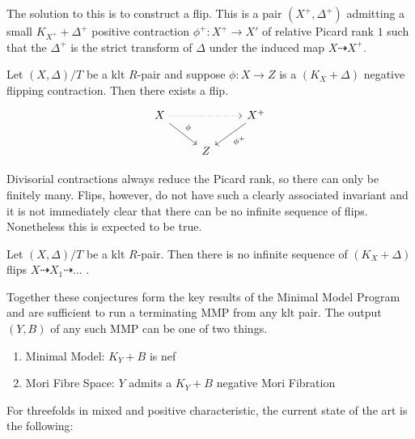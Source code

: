 \documentclass[a4paper,12pt]{book}
\begin{document}
The solution to this is to construct a flip. This is a pair $(X^{+},\Delta^{+})$ admitting a small $K_{X^{+}} +\Delta^{+}$ positive contraction $\phi^{+}:X^{+} \to X'$ of relative Picard rank $1$ such that the $\Delta ^{+}$ is the strict transform of $\Delta$ under the induced map $X \dashrightarrow X^{+}$.

\begin{conjecture}\label{flips-conj}
	Let $(X,\Delta)/T$ be a klt $R$-pair and suppose $\phi:X \to Z$ is a $(K_{X}+\Delta)$ negative flipping contraction. Then there exists a flip. \[\begin{tikzcd}
	X \arrow[rr, dotted] \arrow[rd, "\phi"] &   & X^{+} \arrow[ld, "\phi^{+}"] \\
	& Z &                             
	\end{tikzcd}\]	
\end{conjecture}

Divisorial contractions always reduce the Picard rank, so there can only be finitely many. Flips, however, do not have such a clearly associated invariant and it is not immediately clear that there can be no infinite sequence of flips. Nonetheless this is expected to be true.

\begin{conjecture}
	
	Let $(X,\Delta)/T$ be a klt $R$-pair. Then there is no infinite sequence of $(K_{X}+\Delta)$ flips $X \dashrightarrow X_{1} \dashrightarrow ...$ .
	
	\end{conjecture}

Together these conjectures form the key results of the Minimal Model Program and are sufficient to run a terminating MMP from any klt pair. The output $(Y,B)$ of any such MMP can be one of two things.

\begin{enumerate}
	\item Minimal Model: $K_{Y}+B$ is nef
	\item Mori Fibre Space: $Y$ admits a $K_{Y}+B$ negative Mori Fibration
\end{enumerate}

For threefolds in mixed and positive characteristic, the current state of the art is the following:
\end{document}

